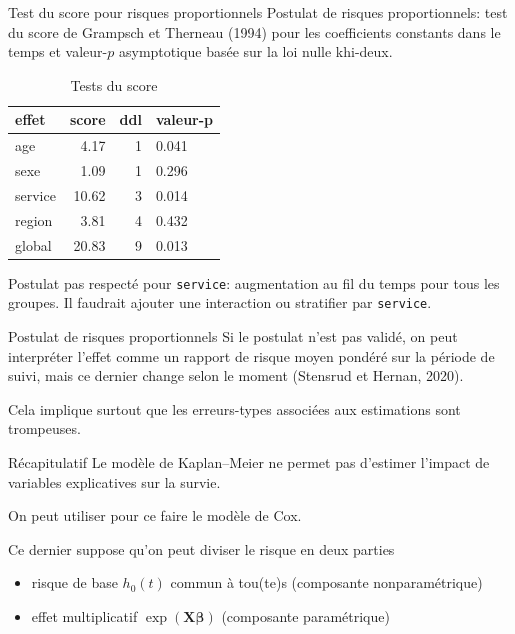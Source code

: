 \documentclass[
  ignorenonframetext,
]{beamer}
\providecommand{\tightlist}{%
  \setlength{\itemsep}{0pt}\setlength{\parskip}{0pt}}\usepackage{longtable,booktabs,array}
\begin{document}
\begin{frame}[fragile]{Test du score pour risques proportionnels}
\protect\hypertarget{test-du-score-pour-risques-proportionnels}{}
Postulat de risques proportionnels: test du score de Grampsch et
Therneau (1994) pour les coefficients constants dans le temps et
valeur-\(p\) asymptotique basée sur la loi nulle khi-deux.

\hypertarget{tbl-coxph-hypothese}{}
\begin{table}
\caption{\label{tbl-coxph-hypothese}Tests du score }\tabularnewline

\centering
\begin{tabular}{lrrl}
\toprule
effet & score & ddl & valeur-p\\
\midrule
age & 4.17 & 1 & 0.041\\
sexe & 1.09 & 1 & 0.296\\
service & 10.62 & 3 & 0.014\\
region & 3.81 & 4 & 0.432\\
global & 20.83 & 9 & 0.013\\
\bottomrule
\end{tabular}
\end{table}

\footnotesize

Postulat pas respecté pour \texttt{service}: augmentation au fil du
temps pour tous les groupes. Il faudrait ajouter une interaction ou
stratifier par \texttt{service}.
\end{frame}

\begin{frame}{Postulat de risques proportionnels}
\protect\hypertarget{postulat-de-risques-proportionnels-1}{}
Si le postulat n'est pas validé, on peut interpréter l'effet comme un
rapport de risque moyen pondéré sur la période de suivi, mais ce dernier
change selon le moment (Stensrud et Hernan, 2020).

Cela implique surtout que les erreurs-types associées aux estimations
sont trompeuses.
\end{frame}

\begin{frame}{Récapitulatif}
\protect\hypertarget{ruxe9capitulatif-5}{}
Le modèle de Kaplan--Meier ne permet pas d'estimer l'impact de variables
explicatives sur la survie.

On peut utiliser pour ce faire le modèle de Cox.

Ce dernier suppose qu'on peut diviser le risque en deux parties

\begin{itemize}
\tightlist
\item
  risque de base \(h_0(t)\) commun à tou(te)s (composante
  nonparamétrique)
\item
  effet multiplicatif \(\exp(\mathbf{X}\boldsymbol{\beta})\) (composante
  paramétrique)
\end{itemize}
\end{frame}
\end{document}
